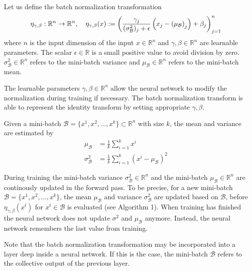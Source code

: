 \documentclass[twoside,a4paper]{article}
\begin{document}

Let us define the batch normalization transformation
\begin{equation*}
	\eta_{\gamma, \beta} : \mathbb{R}^n \to \mathbb{R}^n,\quad
	\eta_{\gamma, \beta}(x) 
	:= \left( \frac{\gamma_j}{(\sigma^2_\mathcal{B})_j + \epsilon} 
	\left( x_j - \left( \mu_\mathcal{B} \right)_j \right) + \beta_j \right)_{j=1}^n
\end{equation*}
where $n$ is the input dimension of the input $x \in \mathbb{R}^n$ and $\gamma, \beta \in \mathbb{R}^{n}$ 
are learnable parameters.
The scalar $\epsilon \in \mathbb{R}$ is a small positive value to avoid division by zero.
$\sigma^2_\mathcal{B} \in \mathbb{R}^{n}$ refers to the mini-batch variance and
$\mu_\mathcal{B} \in \mathbb{R}^{n}$ refers to the mini-batch mean.

The learnable parameters $\gamma, \beta \in \mathbb{R}^{n}$ allow the neural network to modify
the normalization during training if necessary. The batch normalization transform is able to 
represent the identity transform by setting appropriate $\gamma, \beta$.

Given a mini-batch $\mathcal{B} = \{  x^1, x^2, \dots, x^k \} \subset \mathbb{R}^{n}$
with size $k$, the mean and variance are estimated by
\begin{align*}
	\mu_\mathcal{B} &= \frac{1}{k} \sum_{i=1}^{k} x^i \\
	\sigma^2_\mathcal{B} &= \frac{1}{k} \sum_{i=1}^{k} (x^i - \mu_\mathcal{B})^2
\end{align*}

During training the mini-batch variance $\sigma^2_\mathcal{B} \in \mathbb{R}^{n}$ and
the mini-batch $\mu_\mathcal{B} \in \mathbb{R}^{n}$ are continously updated in the forward pass.
To be precise, for a new mini-batch $\mathcal{B} = \{ x^1, x^2, \dots, x^k \}$, 
the mean $\mu_\mathcal{B}$ and variance $\sigma^2_\mathcal{B}$
are updated based on $\mathcal{B}$, before $\eta_{\gamma, \beta}(x^t)$ for
$x^t \in \mathcal{B}$ is evaluated (see Algorithm 1).
When training has finished the neural network does not update $\sigma^2$ and $\mu_\mathcal{B}$ anymore.
Instead, the neural network remembers the last value from training.

Note that the batch normalization transformation may be incorporated into a layer
deep inside a neural network. 
If this is the case, the mini-batch $\mathcal{B}$ refers to the collective output of the previous layer.
\end{document}
